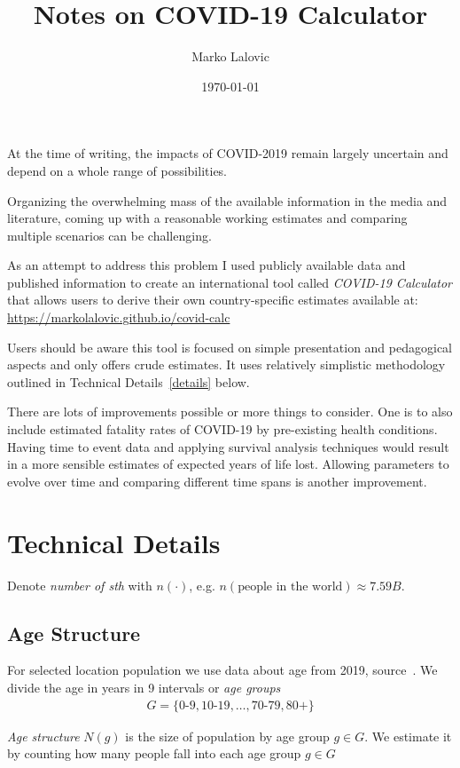 \documentclass[12pt]{article}
\title{Notes on COVID-19 Calculator}
\author{Marko Lalovic}
\date{\today}
\begin{document}
\maketitle

 At the time of writing, the impacts of COVID-2019 remain largely uncertain and depend on a whole range of possibilities.

Organizing the overwhelming mass of the available information in the media and literature,
coming up with a reasonable working estimates and comparing multiple scenarios can be challenging.

As an attempt to address this problem I used publicly available data and published information
to create an international tool called {\it COVID-19 Calculator} that allows users to derive their own country-specific estimates available at: \url{https://markolalovic.github.io/covid-calc}

Users should be aware this tool is focused on simple presentation and pedagogical aspects and only offers crude estimates. It uses relatively simplistic methodology outlined in Technical Details~\ref{details} below.

There are lots of improvements possible or more things to consider. One is to also include estimated fatality rates of COVID-19 by pre-existing health conditions. Having time to event data and applying survival analysis techniques would result in a more sensible estimates of expected years of life lost. Allowing parameters to evolve over time and comparing different time spans is another improvement.

\section*{Technical Details}\label{details}
Denote {\it number of sth} with $n(\cdot)$, e.g. $n(\text{people in the world}) \approx 7.59B$.

\subsection*{Age Structure}
For selected location population we use data about age from 2019, source~\cite{pyramids}. We divide the age in years in 9 intervals or {\it age groups}
\begin{align*}
G =
  \{ \text{0-9}, \text{10-19}, \ldots, \text{70-79}, \text{80+} \}
\end{align*}

{\it Age structure} $N(g)$ is the size of population by age group $g \in G$. We estimate it by counting how many people fall into each age group $g \in G$
\end{document}
